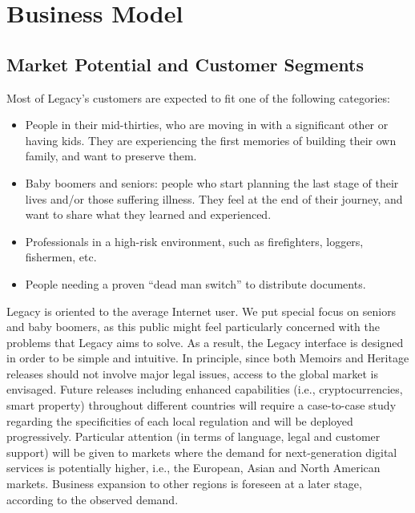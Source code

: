 \chapter{Business Model} %
\label{cha:business_model}


\section{Market Potential and Customer Segments} %
\label{sec:markt_potential_and_customer_segments}
Most of Legacy’s customers are expected to fit one of the following categories:
\begin{itemize}
	\item People in their mid-thirties, who are moving in with a significant other or having kids. They are experiencing the first memories of building their own family, and want to preserve them.
	\item Baby boomers and seniors: people who start planning the last stage of their lives and/or those suffering illness. They feel at the end of their journey, and want to share what they learned and experienced.
	\item Professionals in a high-risk environment, such as firefighters, loggers, fishermen, etc.
	\item People needing a proven “dead man switch” to distribute documents.
\end{itemize}

Legacy is oriented to the average Internet user. We put special focus on seniors  and baby boomers, as this public might feel particularly concerned with the problems that Legacy aims to solve. As a result, the Legacy interface is designed in order to be simple and intuitive. In principle, since both Memoirs and Heritage releases should not involve major legal issues, access to the global market is envisaged. Future releases including enhanced capabilities (i.e., cryptocurrencies, smart property) throughout different countries will require a case-to-case study regarding the specificities of each local regulation and will be deployed progressively. Particular attention (in terms of language, legal and customer support) will be given to markets where the demand for next-generation digital services is potentially higher, i.e., the European, Asian and North American markets. Business expansion to other regions is foreseen at a later stage, according to the observed demand.  

